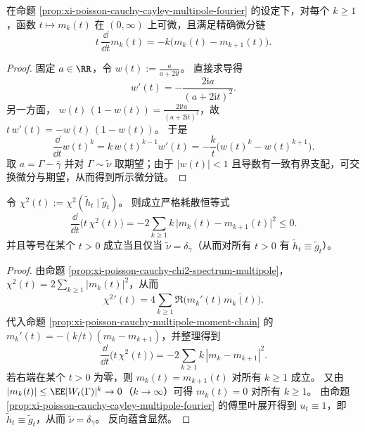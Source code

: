\begin{proposition}[乘极矩的尺度演化链]\label{prop:xi-poisson-cauchy-multipole-moment-chain}
在命题 \ref{prop:xi-poisson-cauchy-cayley-multipole-fourier} 的设定下，对每个 \(k\ge1\)，函数 \(t\mapsto m_k(t)\) 在 \((0,\infty)\) 上可微，且满足精确微分链
\[
t\,\frac{\dd}{\dd t}m_k(t)=-k\bigl(m_k(t)-m_{k+1}(t)\bigr).
\]
\end{proposition}
\begin{proof}
固定 \(a\in\RR\)，令 \(w(t):=\frac{a}{a+2\mathrm{i}t}\)。
直接求导得
\[
w'(t)=-\frac{2\mathrm{i}a}{(a+2\mathrm{i}t)^2}.
\]
另一方面，
\(
w(t)\,(1-w(t))=\frac{2\mathrm{i}ta}{(a+2\mathrm{i}t)^2}
\)，故 \(t\,w'(t)=-w(t)\,(1-w(t))\)。
于是
\[
\frac{\dd}{\dd t}w(t)^k
=k\,w(t)^{k-1}w'(t)
=-\frac{k}{t}\bigl(w(t)^k-w(t)^{k+1}\bigr).
\]
取 \(a=\Gamma-\bar\gamma\) 并对 \(\Gamma\sim\tilde\nu\) 取期望；由于 \(|w(t)|<1\) 且导数有一致有界支配，可交换微分与期望，从而得到所示微分链。
\end{proof}

\begin{proposition}\label{prop:xi-poisson-cauchy-chi2-dissipation-identity}
令 \(\chi^2(t):=\chi^2(\tilde h_t\mid\tilde g_t)\)。
则成立严格耗散恒等式
\[
\frac{\dd}{\dd t}\bigl(t\,\chi^2(t)\bigr)
=-2\sum_{k\ge1}k\,\bigl|m_k(t)-m_{k+1}(t)\bigr|^2\le 0.
\]
并且等号在某个 \(t>0\) 成立当且仅当 \(\tilde\nu=\delta_{\bar\gamma}\)（从而对所有 \(t>0\) 有 \(\tilde h_t\equiv \tilde g_t\)）。
\end{proposition}
\begin{proof}
由命题 \ref{prop:xi-poisson-cauchy-chi2-spectrum-multipole}，
\(
\chi^2(t)=2\sum_{k\ge1}|m_k(t)|^2
\)，从而
\[
\chi^2{}'(t)=4\sum_{k\ge1}\Re\bigl(m_k'(t)\overline{m_k(t)}\bigr).
\]
代入命题 \ref{prop:xi-poisson-cauchy-multipole-moment-chain} 的 \(m_k'(t)=-(k/t)(m_k-m_{k+1})\)，并整理得到
\[
\frac{\dd}{\dd t}\bigl(t\,\chi^2(t)\bigr)
=-2\sum_{k\ge1}k\,|m_k-m_{k+1}|^2.
\]
若右端在某个 \(t>0\) 为零，则 \(m_k(t)=m_{k+1}(t)\) 对所有 \(k\ge1\) 成立。
又由 \(|m_k(t)|\le \EE|W_t(\Gamma)|^k\to 0\)（\(k\to\infty\)）可得 \(m_k(t)=0\) 对所有 \(k\ge1\)。
由命题 \ref{prop:xi-poisson-cauchy-cayley-multipole-fourier} 的傅里叶展开得到 \(u_t\equiv 1\)，即 \(\tilde h_t\equiv \tilde g_t\)，从而 \(\tilde\nu=\delta_{\bar\gamma}\)。
反向蕴含显然。
\end{proof}

